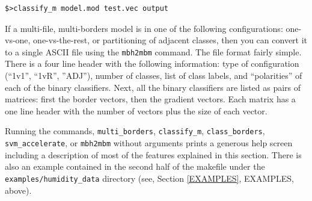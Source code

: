 \documentclass[12pt]{article}
\begin{document}
\begin{verbatim}
$>classify_m model.mod test.vec output
\end{verbatim}

If a multi-file, multi-borders model is in one of the following configurations:
one-vs-one, one-vs-the-rest, or partitioning of adjacent classes, then you
can convert it to a single ASCII file using the \verb/mbh2mbm/ command.
The file format fairly simple. There is a four line header with the 
following information: type of configuration (``1v1'', ``1vR'', ''ADJ''),
number of classes,
list of class labels, and
``polarities'' of each of the binary classifiers.
Next, all the binary classifiers are listed as pairs of matrices: 
first the border vectors, then the gradient vectors. 
Each matrix has a one line header with the number of vectors plus the size of each vector.

Running the commands, \verb"multi_borders", \verb"classify_m", \verb"class_borders", \verb/svm_accelerate/, or \verb/mbh2mbm/ without arguments prints a generous help screen including a description of most of the features explained in this section.  There is also an example contained in the second half of the makefile under the \verb"examples/humidity_data" directory (see, Section \ref{EXAMPLES}, EXAMPLES, above).

\nocite{Kohonen2000}
\nocite{Michie_etal1994}
\nocite{Terrell_Scott1992}
\nocite{Mills2014}
\nocite{Mueller_etal2001}


\end{document}
